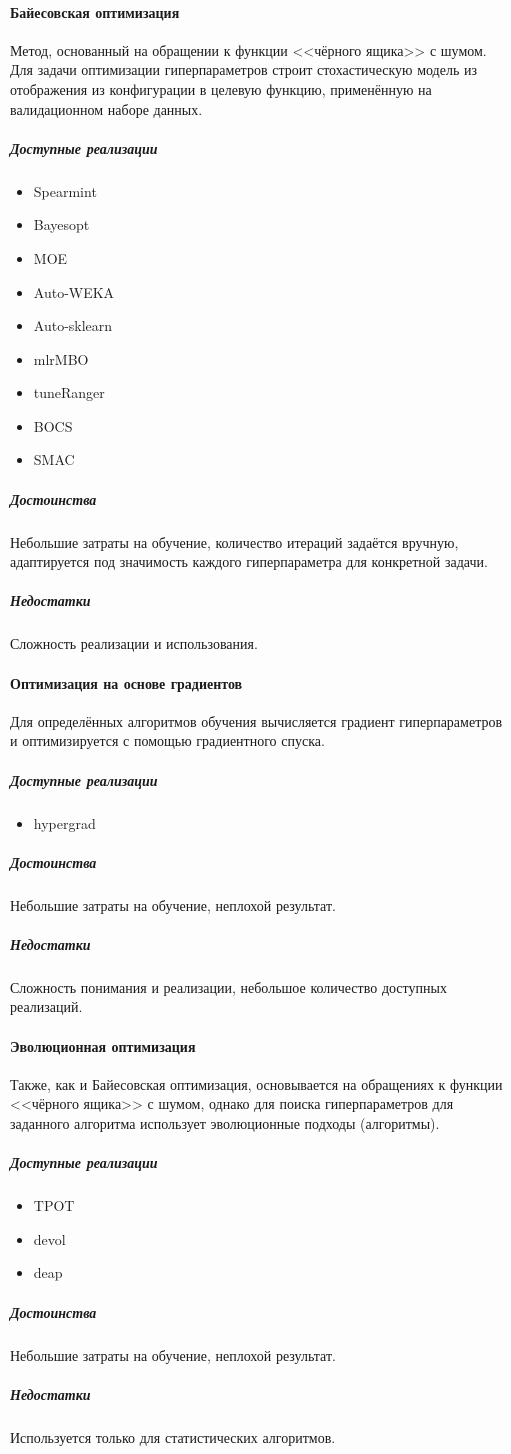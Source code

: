 \documentclass[times,specification,annotation]{itmo-student-thesis}
\begin{document}
	\paragraph{Байесовская оптимизация} Метод, основанный на обращении к функции <<чёрного ящика>> с шумом. Для задачи оптимизации гиперпараметров строит стохастическую модель из отображения из конфигурации в целевую функцию, применённую на валидационном наборе данных.
		\subparagraph{Доступные реализации}
		\begin{itemize}
			\item Spearmint
			\item Bayesopt
			\item MOE
			\item Auto-WEKA
			\item Auto-sklearn
			\item mlrMBO
			\item tuneRanger
			\item BOCS
			\item SMAC
		\end{itemize}
		\subparagraph{Достоинства} Небольшие затраты на обучение, количество итераций задаётся вручную, адаптируется под значимость каждого гиперпараметра для конкретной задачи.
		\subparagraph{Недостатки} Сложность реализации и использования.
	\paragraph{Оптимизация на основе градиентов}  Для определённых алгоритмов обучения вычисляется градиент гиперпараметров и оптимизируется с помощью градиентного спуска.
		\subparagraph{Доступные реализации}
		\begin{itemize}
			\item hypergrad
		\end{itemize}
		\subparagraph{Достоинства} Небольшие затраты на обучение, неплохой результат.
		\subparagraph{Недостатки} Сложность понимания и реализации, небольшое количество доступных реализаций.
	\paragraph{Эволюционная оптимизация} Также, как и Байесовская оптимизация, основывается на обращениях к функции <<чёрного ящика>> с шумом, однако для поиска гиперпараметров для заданного алгоритма использует эволюционные подходы (алгоритмы)\cite{NIPS2011_4443}.
		\subparagraph{Доступные реализации}
		\begin{itemize}
			\item TPOT
			\item devol
			\item deap
		\end{itemize}
		\subparagraph{Достоинства} Небольшие затраты на обучение, неплохой результат.
		\subparagraph{Недостатки} Используется только для статистических алгоритмов. 
		
\end{document}
